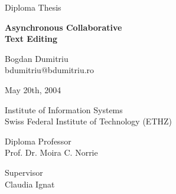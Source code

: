 \begin{titlepage}

\begin{center}

\Large Diploma Thesis

\vspace*{1.0in}

\Huge \textbf{Asynchronous Collaborative\\Text Editing}

\vspace*{0.7in}

\LARGE Bogdan Dumitriu\\bdumitriu@bdumitriu.ro

\vspace*{0.3in}

May 20th, 2004

\vspace*{0.5in}

\LARGE Institute of Information Systems\\Swiss Federal Institute of Technology (ETHZ)

\vspace*{0.5in}

\LARGE Diploma Professor\\Prof. Dr. Moira C. Norrie

\vspace*{0.5in}

\LARGE Supervisor\\Claudia Ignat

\end{center}

\end{titlepage}